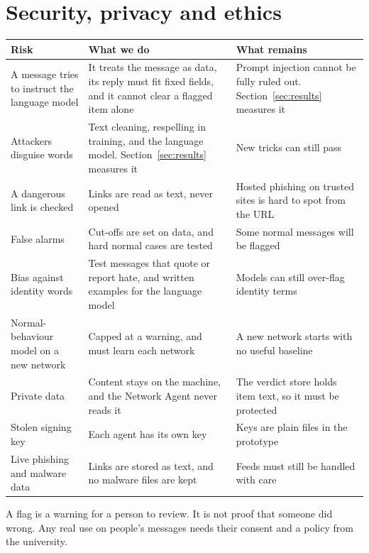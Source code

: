 \documentclass[11pt,a4paper]{article}
\newcommand{\need}[1][10]{\Needspace{#1\baselineskip}}
\begin{document}
\need[27]
\section{Security, privacy and ethics}

\begin{center}
\begin{tabularx}{\linewidth}{P{4cm}YY}
\toprule
\textbf{Risk} & \textbf{What we do} & \textbf{What remains} \\
\midrule
A message tries to instruct the language model & It treats the message as data, its reply must fit fixed fields, and it cannot clear a flagged item alone & Prompt injection cannot be fully ruled out. Section~\ref{sec:results} measures it \\
Attackers disguise words & Text cleaning, respelling in training, and the language model. Section~\ref{sec:results} measures it & New tricks can still pass \\
A dangerous link is checked & Links are read as text, never opened & Hosted phishing on trusted sites is hard to spot from the URL \\
False alarms & Cut-offs are set on data, and hard normal cases are tested & Some normal messages will be flagged \\
Bias against identity words & Test messages that quote or report hate, and written examples for the language model & Models can still over-flag identity terms \\
Normal-behaviour model on a new network & Capped at a warning, and must learn each network & A new network starts with no useful baseline \\
Private data & Content stays on the machine, and the Network Agent never reads it & The verdict store holds item text, so it must be protected \\
Stolen signing key & Each agent has its own key & Keys are plain files in the prototype \\
Live phishing and malware data & Links are stored as text, and no malware files are kept & Feeds must still be handled with care \\
\bottomrule
\end{tabularx}
\end{center}

A flag is a warning for a person to review. It is not proof that someone did wrong. Any real use on people's messages needs their consent and a policy from the university.
\end{document}
